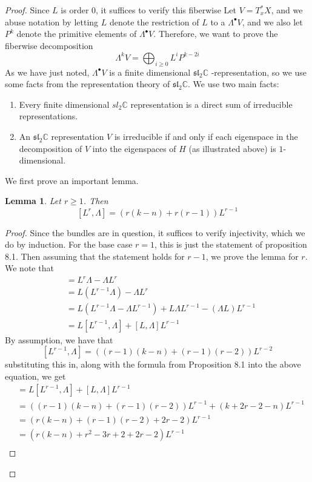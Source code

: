 \documentclass[psamsfonts, 12pt]{amsart}
\newtheorem{lem}[thm]{Lemma}
\theoremstyle{definition}
\theoremstyle{remark}
\renewcommand{\sl}{\mathfrak{sl}}
\newcommand{\C}{\mathbb{C}}
\begin{document}
\begin{proof}
Since $L$ is order $0$, it suffices to verify this fiberwise Let $V = T^*_xX$, and we
abuse notation by letting $L$ denote the restriction of $L$ to a $\Lambda^\bullet V$,
and we also let $P^k$ denote the primitive elements of $\Lambda^\bullet V$. Therefore,
we want to prove the fiberwise decomposition
\[
\Lambda^k V = \bigoplus_{i \geq 0 } L^iP^{k-2i}
\]
As we have just noted, $\Lambda^\bullet V$ is a finite dimensional
$\sl_2\C$ -representation, so we use some facts from the representation theory of
$\sl_2\C$. We use two main facts:
\begin{enumerate}
  \item Every finite dimensional $sl_2\C$ representation is a direct sum of irreducible
  representations.
  \item An $\sl_2\C$ representation $V$ is irreducible if and only if each eigenspace in
  the decomposition of $V$ into the eigenspaces of $H$ (as illustrated above) is
  $1$-dimensional.
\end{enumerate}
We first prove an important lemma.
\begin{lem}
Let $r \geq 1$. Then
\[
[L^r, \Lambda] = (r(k-n)+r(r-1))L^{r-1}
\]
\end{lem}
%
\begin{proof}
Since the bundles are in question, it suffices to verify injectivity, which we do by
induction. For the base case $r=1$, this is just the statement of proposition 8.1. Then
assuming that the statement holds for $r-1$, we prove the lemma for $r$. We note that
\begin{align*}
[L^r,\Lambda] &= L^r\Lambda - \Lambda L^r \\
&= L(L^{r-1}\Lambda) - \Lambda L^r \\
&= L(L^{r-1}\Lambda - \Lambda L^{r-1}) + L\Lambda L^{r-1} - (\Lambda L)L^{r-1} \\
&= L[L^{r-1}, \Lambda] + [L,\Lambda]L^{r-1}
\end{align*}
By assumption, we have that
\[
[L^{r-1},\Lambda] = ((r-1)(k-n) + (r-1)(r-2))L^{r-2}
\]
substituting this in, along with the formula from Proposition 8.1 into the above
equation, we get
\begin{align*}
[L^r,\Lambda] &= L[L^{r-1}, \Lambda] + [L,\Lambda]L^{r-1} \\
&= ((r-1)(k-n) + (r-1)(r-2))L^{r-1} + (k+2r-2 - n)L^{r-1} \\
&= (r(k-n) + (r-1)(r-2) + 2r-2)L^{r-1} \\
&= (r(k-n) + r^2 -3r + 2 + 2r -2)L^{r-1} \\

\end{align*}
\end{proof}
\end{proof}
\end{document}
